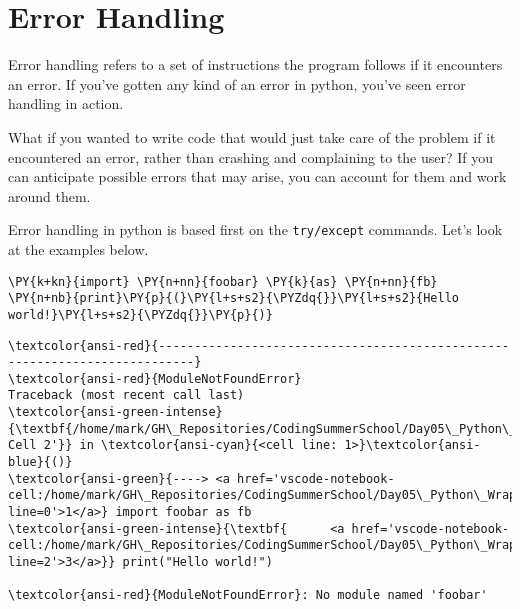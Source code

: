 \section{Error Handling}
Error handling refers to a set of instructions the program follows if it
encounters an error. If you've gotten any kind of an error in python,
you've seen error handling in action.

What if you wanted to write code that would just take care of the
problem if it encountered an error, rather than crashing and complaining
to the user? If you can anticipate possible errors that may arise, you
can account for them and work around them.

Error handling in python is based first on the \texttt{try/except}
commands. Let's look at the examples below.

    \begin{tcolorbox}[breakable, size=fbox, boxrule=1pt, pad at break*=1mm,colback=cellbackground, colframe=cellborder]
\begin{Verbatim}[commandchars=\\\{\}]
\PY{k+kn}{import} \PY{n+nn}{foobar} \PY{k}{as} \PY{n+nn}{fb}
\PY{n+nb}{print}\PY{p}{(}\PY{l+s+s2}{\PYZdq{}}\PY{l+s+s2}{Hello world!}\PY{l+s+s2}{\PYZdq{}}\PY{p}{)}
\end{Verbatim}
\end{tcolorbox}

    \begin{Verbatim}[commandchars=\\\{\}, frame=single, framerule=2mm, rulecolor=\color{outerrorbackground}]
\textcolor{ansi-red}{---------------------------------------------------------------------------}
\textcolor{ansi-red}{ModuleNotFoundError}                       Traceback (most recent call last)
\textcolor{ansi-green-intense}{\textbf{/home/mark/GH\_Repositories/CodingSummerSchool/Day05\_Python\_WrapUp/18\_Python\_Error\_Handling.ipynb Cell 2'}} in \textcolor{ansi-cyan}{<cell line: 1>}\textcolor{ansi-blue}{()}
\textcolor{ansi-green}{----> <a href='vscode-notebook-cell:/home/mark/GH\_Repositories/CodingSummerSchool/Day05\_Python\_WrapUp/18\_Python\_Error\_Handling.ipynb\#ch0000000?line=0'>1</a>} import foobar as fb
\textcolor{ansi-green-intense}{\textbf{      <a href='vscode-notebook-cell:/home/mark/GH\_Repositories/CodingSummerSchool/Day05\_Python\_WrapUp/18\_Python\_Error\_Handling.ipynb\#ch0000000?line=2'>3</a>}} print("Hello world!")

\textcolor{ansi-red}{ModuleNotFoundError}: No module named 'foobar'
    \end{Verbatim}

